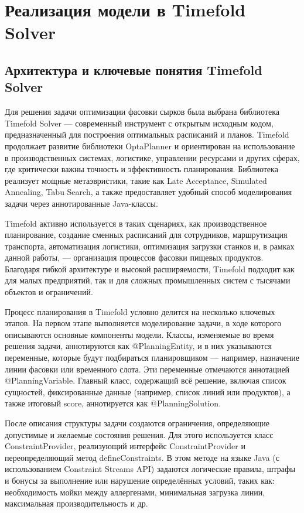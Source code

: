 \chapter{Реализация модели в Timefold Solver}
\label{ch:chapter3}

\section{Архитектура и ключевые понятия Timefold Solver}

Для решения задачи оптимизации фасовки сырков была выбрана библиотека Timefold Solver — современный инструмент с открытым исходным кодом, предназначенный для построения оптимальных расписаний и планов. Timefold продолжает развитие библиотеки OptaPlanner и ориентирован на использование в производственных системах, логистике, управлении ресурсами и других сферах, где критически важны точность и эффективность планирования. Библиотека реализует мощные метаэвристики, такие как Late Acceptance, Simulated Annealing, Tabu Search, а также предоставляет удобный способ моделирования задачи через аннотированные Java-классы.

Timefold активно используется в таких сценариях, как производственное планирование, создание сменных расписаний для сотрудников, маршрутизация транспорта, автоматизация логистики, оптимизация загрузки станков и, в рамках данной работы, — организация процессов фасовки пищевых продуктов. Благодаря гибкой архитектуре и высокой расширяемости, Timefold подходит как для малых предприятий, так и для сложных промышленных систем с тысячами объектов и ограничений.

Процесс планирования в Timefold условно делится на несколько ключевых этапов. На первом этапе выполняется моделирование задачи, в ходе которого описываются основные компоненты модели. Классы, изменяемые во время решения задачи, аннотируются как @PlanningEntity, и в них указываются переменные, которые будут подбираться планировщиком — например, назначение линии фасовки или временного слота. Эти переменные отмечаются аннотацией @PlanningVariable. Главный класс, содержащий всё решение, включая список сущностей, фиксированные данные (например, список линий или продуктов), а также итоговый score, аннотируется как @PlanningSolution. \cite{timefold2025docs}

После описания структуры задачи создаются ограничения, определяющие допустимые и желаемые состояния решения. Для этого используется класс ConstraintProvider, реализующий интерфейс ConstraintProvider и переопределяющий метод defineConstraints. В этом методе на языке Java (с использованием Constraint Streams API) задаются логические правила, штрафы и бонусы за выполнение или нарушение определённых условий, таких как: необходимость мойки между аллергенами, минимальная загрузка линии, максимальная производительность и др.

